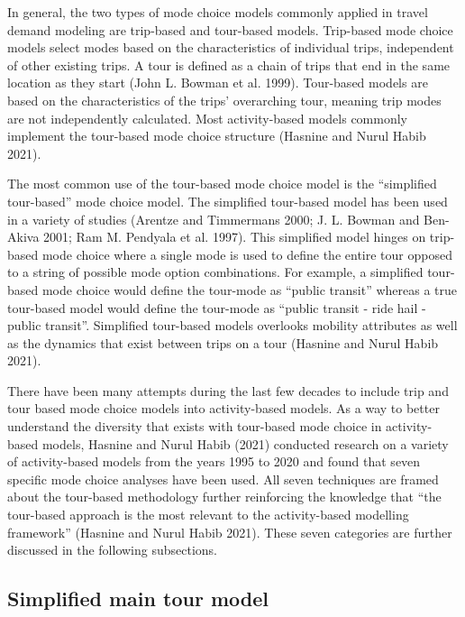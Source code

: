 \documentclass[12pt, oneside, openright]{byuthesis}
\begin{document}
In general, the two types of mode choice models commonly applied in travel demand modeling are trip-based and tour-based models. Trip-based mode choice models select modes based on the characteristics of individual trips, independent of other existing trips. A tour is defined as a chain of trips that end in the same location as they start (John L. Bowman et al. 1999). Tour-based models are based on the characteristics of the trips' overarching tour, meaning trip modes are not independently calculated. Most activity-based models commonly implement the tour-based mode choice structure (Hasnine and Nurul Habib 2021).

The most common use of the tour-based mode choice model is the ``simplified tour-based'' mode choice model. The simplified tour-based model has been used in a variety of studies (Arentze and Timmermans 2000; J. L. Bowman and Ben-Akiva 2001; Ram M. Pendyala et al. 1997). This simplified model hinges on trip-based mode choice where a single mode is used to define the entire tour opposed to a string of possible mode option combinations. For example, a simplified tour-based mode choice would define the tour-mode as ``public transit'' whereas a true tour-based model would define the tour-mode as ``public transit - ride hail - public transit''. Simplified tour-based models overlooks mobility attributes as well as the dynamics that exist between trips on a tour (Hasnine and Nurul Habib 2021).

There have been many attempts during the last few decades to include trip and tour based mode choice models into activity-based models. As a way to better understand the diversity that exists with tour-based mode choice in activity-based models, Hasnine and Nurul Habib (2021) conducted research on a variety of activity-based models from the years 1995 to 2020 and found that seven specific mode choice analyses have been used. All seven techniques are framed about the tour-based methodology further reinforcing the knowledge that ``the tour-based approach is the most relevant to the activity-based modelling framework'' (Hasnine and Nurul Habib 2021). These seven categories are further discussed in the following subsections.

\hypertarget{lit31}{%
\subsection{Simplified main tour model}\label{lit31}}
\end{document}
